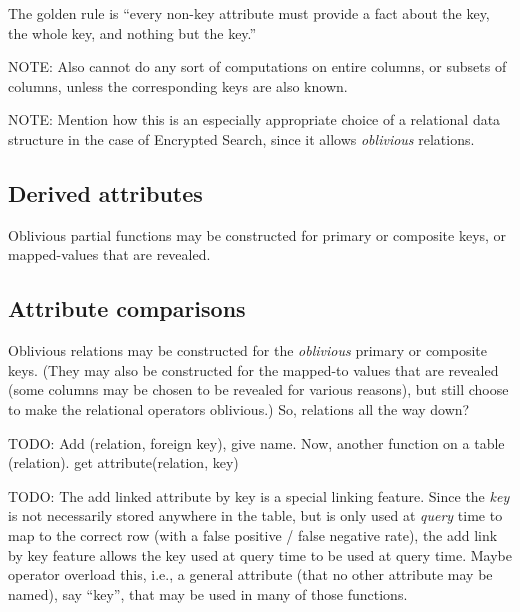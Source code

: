 \documentclass[ ../main.tex]{subfiles}
\begin{document}
The golden rule is ``every non-key attribute must provide a fact about the key, the whole key, and nothing but the key.''


NOTE: Also cannot do any sort of computations on entire columns, or subsets of columns, unless the corresponding keys are also known.

NOTE: Mention how this is an especially appropriate choice of a relational data structure in the case of Encrypted Search, since it allows \emph{oblivious} relations.









\subsection{Derived attributes}
Oblivious partial functions may be constructed for primary or composite keys, or mapped-values that are revealed.

\subsection{Attribute comparisons}
Oblivious relations may be constructed for the \emph{oblivious} primary or composite keys. (They may also be constructed for the mapped-to values that are revealed (some columns may be chosen to be revealed for various reasons), but still choose to make the relational operators oblivious.) So, relations all the way down?






TODO: Add (relation, foreign key), give name. Now, another function on a table (relation). get attribute(relation, key)

TODO: The add linked attribute by key is a special linking feature. Since the \emph{key} is not necessarily stored anywhere in the table, but is only used at \emph{query} time to map to the correct row (with a false positive / false negative rate), the add link by key feature allows the key used at query time to be used at query time. Maybe operator overload this, i.e., a general attribute (that no other attribute may be named), say ``key'', that may be used in many of those functions.
\end{document}
